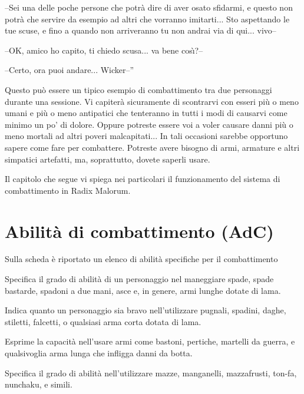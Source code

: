 \begin{racconto}
  --Sei una delle poche persone che potr\`a dire di aver osato
  sfidarmi, e questo non potr\`a che servire da esempio ad altri che
  vorranno imitarti... Sto aspettando le tue scuse, e fino a quando
  non arriveranno tu non andrai via di qui... vivo--
  
  --OK, amico ho capito, ti chiedo scusa... va bene cos\`{\i}?--
  
  --Certo, ora puoi andare... Wicker--''
\end{racconto}


\twocolumn 

Questo pu\`o essere un tipico esempio di combattimento
tra due personaggi durante una sessione. Vi capiter\`a sicuramente
di scontrarvi con esseri pi\`u o meno umani e pi\`u o meno
antipatici che tenteranno in tutti i modi di causarvi come minimo un
po' di dolore. Oppure potreste essere voi a voler causare danni
pi\`u o meno mortali ad altri poveri malcapitati... In tali
occasioni sarebbe opportuno sapere come fare per combattere. Potreste
avere bisogno di armi, armature e altri simpatici artefatti, ma,
soprattutto, dovete saperli usare.

Il capitolo che segue vi spiega nei particolari il funzionamento del
sistema di combattimento in Radix Malorum.
\fi

\section{Abilit\`a di combattimento (AdC)}

 Sulla scheda \`e riportato un elenco di
abilit\`a specifiche per il combattimento

 Specifica il grado di
abilit\`a di un personaggio nel maneggiare spade, spade bastarde,
spadoni a due mani, asce e, in genere, armi lunghe dotate di lama.

 Indica quanto un personaggio
sia bravo nell'utilizzare pugnali, spadini, daghe, stiletti, falcetti,
o qualsiasi arma corta dotata di lama.

\iffullversion

Esprime la capacit\`a nell'usare armi come bastoni,
pertiche, martelli da guerra, e qualsivoglia arma lunga che infligga
danni da botta.

 Specifica il
grado di abilit\`a nell'utilizzare mazze, manganelli, mazzafrusti,
ton-fa, nunchaku, e simili.
\fi

